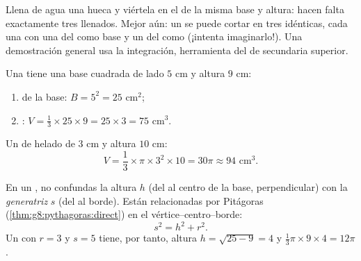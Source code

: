 \begin{remark}
Llena de agua una  hueca y viértela en el  de la misma
base y altura: hacen falta exactamente tres llenados. Mejor aún: un 
se puede cortar en tres  idénticas, cada una con una  del
 como base y un  del  como  (¡intenta imaginarlo!).
Una demostración general usa la integración, herramienta del  de secundaria superior.
\end{remark}

\begin{example}\label{ex:g8:solids:volume}
Una  tiene una base cuadrada de lado $5$ cm y altura $9$ cm:
\begin{enumerate}
  \item {} de la base: $B = 5^2 = 25$ cm$^2$;
  \item {}: $V = \frac13 \times 25 \times 9 = 25 \times 3 = 75$
        cm$^3$.
\end{enumerate}
Un  de helado de  $3$ cm y altura $10$ cm:
\[
V = \frac13 \times \pi \times 3^2 \times 10 = 30\pi \approx 94
\text{ cm}^3 .
\]
\end{example}

\begin{example}\label{ex:g8:solids:slant}
En un , no confundas la altura $h$ (del  al centro de la
base, perpendicular) con la \emph{generatriz} $s$ (del  al
borde). Están relacionadas por Pitágoras
(\cref{thm:g8:pythagoras:direct}) en el 
vértice--centro--borde:
\[
s^2 = h^2 + r^2 .
\]
Un  con $r = 3$ y $s = 5$ tiene, por tanto, altura
$h = \sqrt{25 - 9} = 4$ y 
$\frac13 \pi \times 9 \times 4 = 12\pi$.
\end{example}

